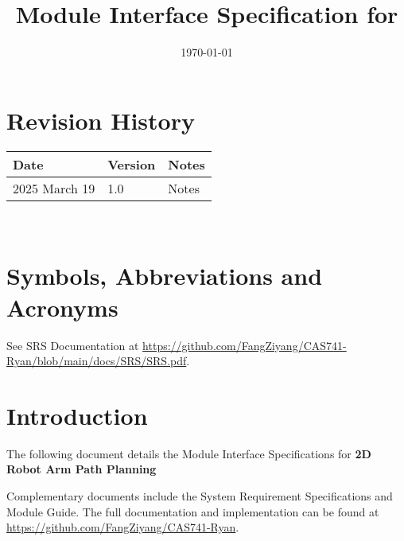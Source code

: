 \documentclass[12pt, titlepage]{article}
\begin{document}
\title{Module Interface Specification for \progname{}}

\author{\authname}

\date{\today}

\maketitle


\section{Revision History}

\begin{tabularx}{\textwidth}{p{3cm}p{2cm}X}
\toprule {\bf Date} & {\bf Version} & {\bf Notes}\\
\midrule
2025 March 19 & 1.0 & Notes\\
\bottomrule
\end{tabularx}

~\newpage

\section{Symbols, Abbreviations and Acronyms}

See SRS Documentation at \url{https://github.com/FangZiyang/CAS741-Ryan/blob/main/docs/SRS/SRS.pdf}.


\newpage

\tableofcontents

\newpage


\section{Introduction}


The following document details the Module Interface Specifications for
\textbf{2D Robot Arm Path Planning} 

Complementary documents include the System Requirement Specifications
and Module Guide.  The full documentation and implementation can be
found at \url{https://github.com/FangZiyang/CAS741-Ryan}. 

\end{document}
